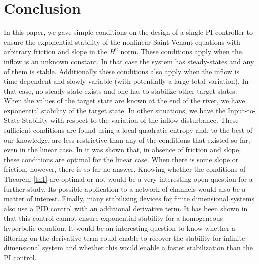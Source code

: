 \section{Conclusion}
In this paper, we gave simple conditions on the design of a single PI controller to ensure
the exponential stability of the nonlinear Saint-Venant equations with arbitrary friction and slope in the $H^{2}$ norm.
These conditions apply when the inflow is an unknown constant{. I}n that case the system has steady-states and any of them is stable. {Additionally these conditions} also apply when
the inflow is time-dependent and slowly variable (with potentially a large total variation). In that case, no steady-state exists and one has to stabilize other target states.
When the values of the target state are known at the end of the river, we have exponential stability of the target state.
{In other situations}, we have the Input-to-State Stability with respect to the variation of the inflow disturbance.
These sufficient conditions are found using a local quadratic entropy
and, to the best of our knowledge, are less restrictive than any of the conditions that existed so far, even in the linear case.
In \cite{BastinCoronTamasoiu2015} it was shown that, in absence of friction and slope, these conditions {are} optimal for the linear case. When there is some slope or friction, however, there is so far no answer{. Knowing }whether the conditions of Theorem \ref{th1} are optimal or not would be a very interesting {open question} for a further study. {Its possible application to a network of channels would also be a matter of interest.
Finally, many stabilizing devices for finite dimensional systems also use a PID control with an additional derivative term.
It has been shown in \cite{CoronTamasoiu2015} that this control cannot ensure exponential stability for a homogeneous hyperbolic equation.
It would be an interesting question to know whether a filtering on the derivative term could enable to recover the stability for infinite dimensional system and whether this would enable a faster stabilization than the PI control.}

\appendix
